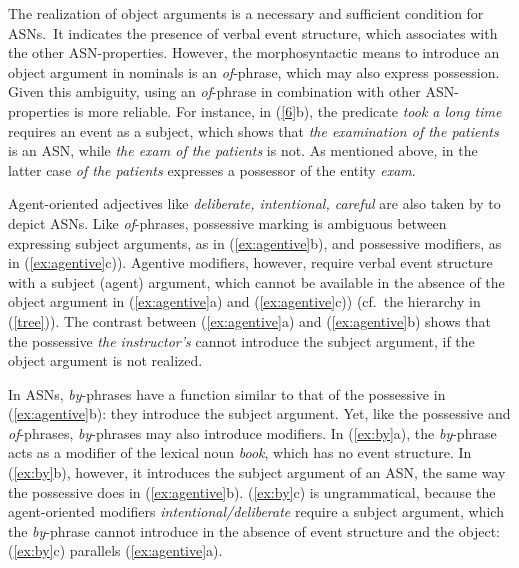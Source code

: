 \documentclass[output=paper]{langsci/langscibook}
\begin{document}
 The realization of object arguments is a necessary and sufficient condition for ASNs.\ It indicates the presence of verbal event structure, which associates with the other ASN-properties. However, the morphosyntactic means to introduce an object argument in nominals is an \textit{of}-phrase, which may also express possession. Given this ambiguity, using an  \textit{of}-phrase in combination with other ASN-properties is more reliable. For instance, in  (\ref{6}b), the predicate \textit{took a long time} requires an event as a subject, which shows that \textit{the examination of the patients} is an ASN, while \textit{the exam of the patients} is not.
As mentioned above, in the latter case \textit{of the patients} expresses a possessor of the entity \textit{exam}.

Agent-oriented adjectives like \textit{deliberate, intentional, careful} are also taken by \citet[51--52]{grimshaw:90} to depict ASNs.  Like \textit{of}-phrases, possessive marking is ambiguous between expressing subject arguments, as in (\ref{ex:agentive}b), and possessive modifiers,  as in (\ref{ex:agentive}c)). Agentive modifiers, however, require verbal event structure with a subject (agent) argument, which cannot be available in the absence of the object argument in (\ref{ex:agentive}a) and (\ref{ex:agentive}c)) (cf.~the hierarchy in (\ref{tree})). The contrast between (\ref{ex:agentive}a) and (\ref{ex:agentive}b) shows that the possessive \textit{the instructor's} cannot introduce the subject argument, if the object argument is not realized.

\begin{exe}
\end{exe}

 In ASNs, \textit{by}-phrases have a function similar to that of the possessive in (\ref{ex:agentive}b): they introduce the subject argument. Yet, like the possessive and \textit{of}-phrases, \textit{by}-phrases may also introduce modifiers. In (\ref{ex:by}a), the \textit{by}-phrase acts as a modifier of the lexical noun \textit{book}, which has no event structure. In (\ref{ex:by}b), however, it introduces the subject argument of an ASN, the same way the possessive does in (\ref{ex:agentive}b). (\ref{ex:by}c) is ungrammatical, because the agent-oriented modifiers \textit{intentional/deliberate} require a subject argument, which the \textit{by}-phrase cannot introduce in the absence of event structure and the object: (\ref{ex:by}c) parallels (\ref{ex:agentive}a).
\end{document}
